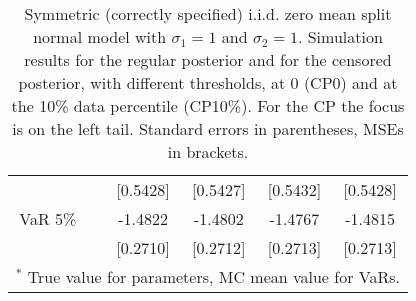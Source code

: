 {\begin{table}
\begin{tabular}{cc cccc}
  && [0.5428] & [0.5427] & [0.5432] & [0.5428]  \\ 
VaR 5\% && -1.4822 & -1.4802 & -1.4767 & -1.4815  \\ 
 && [0.2710] & [0.2712] & [0.2713] & [0.2713]  \\ 
\hline 
\multicolumn{6}{l}{\footnotesize{$^*$ True value for parameters, MC mean value for VaRs.}}  \\ 
\end{tabular}
 \caption{Symmetric (correctly specified) i.i.d. zero mean split normal model with $\sigma_{1} = 1$ and $\sigma_{2} = 1$. Simulation results for the regular posterior and for the censored posterior,  with different thresholds, at $0$ (CP0) and at the 10\% data percentile (CP10\%). For the CP the focus is on the left tail. Standard errors in parentheses, MSEs in brackets.} 
\label{tab:iid}  
\end{table}
}